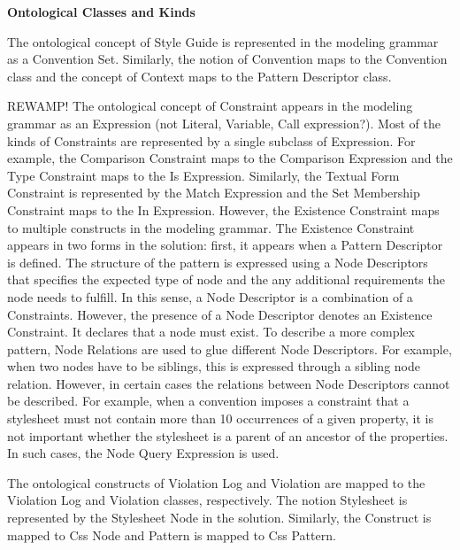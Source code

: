 \documentclass[parskip=full]{uvamscse}
\begin{document}
\begin{center}
\begin{longtable}{ | p{17em} | p{23em} | }
\end{longtable}
\end{center}

\textbf{Ontological Classes and Kinds}

The ontological concept of Style Guide is represented in the modeling grammar as a Convention Set.
Similarly, the notion of Convention maps to the Convention class and the concept of Context maps to
the Pattern Descriptor class.

REWAMP!
The ontological concept of Constraint appears in the modeling grammar as an Expression (not Literal,
Variable, Call expression?). Most of the kinds of Constraints are represented by a single subclass
of Expression. For example, the Comparison Constraint maps to the Comparison Expression and the Type
Constraint maps to the Is Expression. Similarly, the Textual Form Constraint is represented by the
Match Expression and the Set Membership Constraint maps to the In Expression. However, the Existence
Constraint maps to multiple constructs in the modeling grammar. The Existence Constraint appears in
two forms in the solution: first, it appears when a Pattern Descriptor is defined. The structure of
the pattern is expressed using a Node Descriptors that specifies the expected type of node and the
any additional requirements the node needs to fulfill. In this sense, a Node Descriptor is a
combination of a Constraints. However, the presence of a Node Descriptor denotes an Existence
Constraint. It declares that a node must exist. To describe a more complex pattern, Node Relations
are used to glue different Node Descriptors. For example, when two nodes have to be siblings, this
is expressed through a sibling node relation. However, in certain cases the relations between Node
Descriptors cannot be described. For example, when a convention imposes a constraint that a
stylesheet must not contain more than 10 occurrences of a given property, it is not important
whether the stylesheet is a parent of an ancestor of the properties. In such cases, the Node Query
Expression is used.

The ontological constructs of Violation Log and Violation are mapped to the Violation Log and
Violation classes, respectively. The notion Stylesheet is represented by the Stylesheet Node in the
solution. Similarly, the Construct is mapped to Css Node and Pattern is mapped to Css Pattern.
\end{document}

